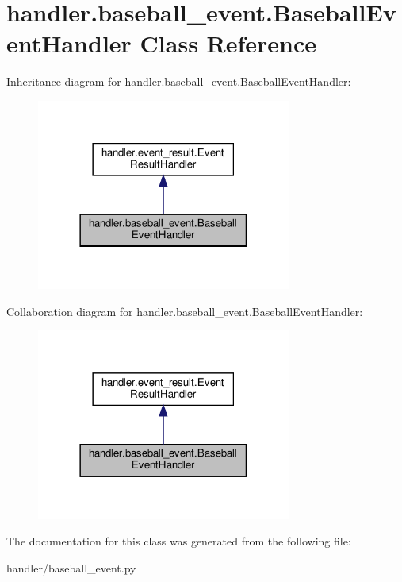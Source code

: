 \hypertarget{classhandler_1_1baseball__event_1_1_baseball_event_handler}{}\section{handler.\+baseball\+\_\+event.\+Baseball\+Event\+Handler Class Reference}
\label{classhandler_1_1baseball__event_1_1_baseball_event_handler}


Inheritance diagram for handler.\+baseball\+\_\+event.\+Baseball\+Event\+Handler\+:
\nopagebreak
\begin{figure}[H]
\begin{center}
\leavevmode
\includegraphics[width=237pt]{classhandler_1_1baseball__event_1_1_baseball_event_handler__inherit__graph}
\end{center}
\end{figure}


Collaboration diagram for handler.\+baseball\+\_\+event.\+Baseball\+Event\+Handler\+:
\nopagebreak
\begin{figure}[H]
\begin{center}
\leavevmode
\includegraphics[width=237pt]{classhandler_1_1baseball__event_1_1_baseball_event_handler__coll__graph}
\end{center}
\end{figure}


The documentation for this class was generated from the following file\+:\begin{DoxyCompactItemize}
\item 
handler/baseball\+\_\+event.\+py\end{DoxyCompactItemize}
